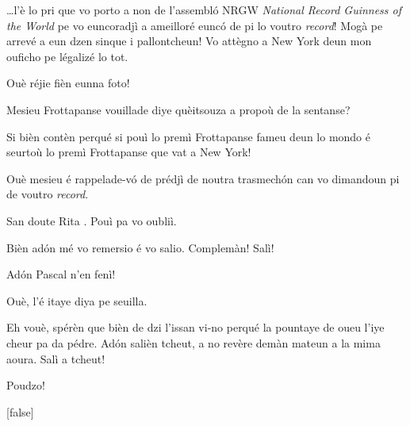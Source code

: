 \begin{drama}

\Tissotspeaks \ldots l’è lo pri que vo porto a non de l’assembló NRGW \textit{National Record Guinness of the World} pe vo euncoradjì a ameilloré eunc\'o de pi lo voutro \textit{record}!  Mogà pe arrevé a eun dzen sinque i pallontcheun! Vo attègno a New York deun mon ouficho pe légalizé lo tot.

\Ritaspeaks Ouè réjie fièn eunna foto!


\Ritaspeaks Mesieu Frottapanse vouillade diye quèitsouza a propoù de la sentanse?

\Cienspeaks Si bièn contèn perqué si pouì lo premì Frottapanse fameu deun lo mondo é seurtoù lo premì Frottapanse que vat a New York!

\Ritaspeaks Ouè mesieu é rappelade-v\'o de prédjì de noutra trasmechón can vo dimandoun pi de voutro \textit{record}.

\Cienspeaks San doute Rita \ok. Pouì pa vo oubliì.

\Ritaspeaks  Bièn ad\'on mé vo remersio é vo salio. Complemàn! Salì!


\Ritaspeaks Adón Pascal n'en fenì!

\Pascalspeaks Ouè, l’é itaye diya pe seuilla.

\Ritaspeaks Eh vouè, spérèn que bièn de dzi l’issan vi-no perqué la pountaye de oueu l’iye cheur pa da pédre. Adón salièn tcheut, a no revère demàn mateun a la mima aoura. Salì a tcheut!

\Pascalspeaks Poudzo!

[false]

\ridocliou

\DeriLeRido


\end{drama}
